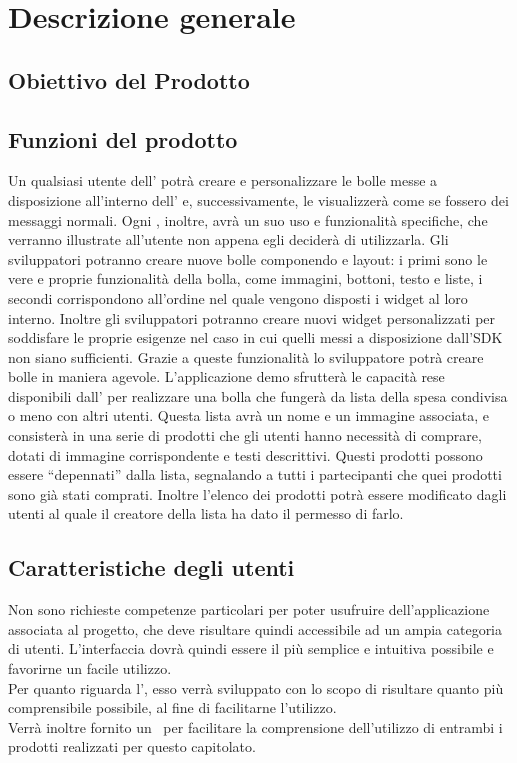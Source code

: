 \section{Descrizione generale}
\subsection{Obiettivo del Prodotto}
\scopoProdotto

\subsection{Funzioni del prodotto}
Un qualsiasi utente dell' potrà creare e personalizzare le bolle messe a disposizione all'interno dell' e, successivamente, le visualizzerà come se fossero dei messaggi normali. Ogni , inoltre, avrà un suo uso e funzionalità specifiche, che verranno illustrate all'utente non appena egli deciderà di utilizzarla. Gli sviluppatori potranno creare nuove bolle componendo  e layout: i primi sono le vere e proprie funzionalità della bolla, come immagini, bottoni, testo e liste, i secondi corrispondono all’ordine nel quale vengono disposti i widget al loro interno. Inoltre gli sviluppatori potranno creare nuovi widget personalizzati per soddisfare le proprie esigenze nel caso in cui quelli messi a disposizione dall’SDK non siano sufficienti. Grazie a queste funzionalità lo sviluppatore potrà creare bolle in maniera agevole.
L'applicazione demo sfrutterà le capacità rese disponibili dall' per realizzare una bolla che fungerà da lista della spesa condivisa o meno con altri utenti. Questa lista avrà un nome e un immagine associata, e  consisterà in una serie di prodotti che gli utenti hanno necessità di comprare, dotati di immagine corrispondente e testi descrittivi. Questi prodotti  possono essere “depennati” dalla lista, segnalando a tutti i partecipanti che quei prodotti sono già stati comprati. Inoltre l’elenco dei prodotti potrà essere modificato dagli utenti al quale il creatore della lista ha dato il permesso di farlo.

\subsection{Caratteristiche degli utenti}
Non sono richieste competenze particolari per poter usufruire dell'applicazione associata al progetto, che deve risultare quindi accessibile ad un ampia categoria di utenti. L'interfaccia dovrà quindi essere il più semplice e intuitiva possibile e favorirne un facile utilizzo. \\
Per quanto riguarda l', esso verrà sviluppato con lo scopo di risultare quanto più comprensibile possibile, al fine di facilitarne l'utilizzo. \\
Verrà inoltre fornito un \MU\ per facilitare la comprensione dell'utilizzo di entrambi i prodotti realizzati per questo capitolato.


